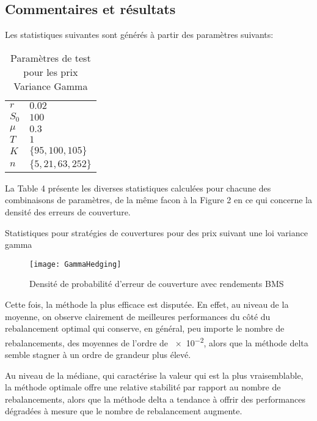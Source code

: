 \documentclass[12pt,fleqn]{article}
\begin{document}
\subsection*{Commentaires et résultats}

Les statistiques suivantes sont générés à partir des paramètres suivants:
\begin{table}[h]
  \centering
  \begin{tabular}[h]{ll}
    $r$ & $0.02$\\
    $S_0$ & $100$\\
    $\mu$ & $0.3$\\
    $T$ & $1$\\
    $K$ & $\{95,100,105\}$\\
    $n$ & $\{5,21,63,252\}$\\
  \end{tabular}
  \caption{Paramètres de test pour les prix Variance Gamma}
  \label{tab:1}
\end{table}

La Table 4 présente les diverses statistiques calculées pour chacune des combinaisons de
paramètres, de la même facon à la Figure 2 en ce qui concerne la densité des erreurs de
couverture. 

\begin{table}
\footnotesize{}
\caption{Statistiques pour stratégies de couvertures pour des prix suivant une loi
  variance gamma}
\end{table}

\begin{figure}
  \centering
  \texttt{[image: GammaHedging]}
  \caption{Densité de probabilité d'erreur de couverture avec rendements BMS}
  \label{fig:1}
\end{figure}

Cette fois, la méthode la plus efficace est disputée. En effet, au niveau de la moyenne,
on observe clairement de meilleures performances du côté du rebalancement optimal qui
conserve, en général, peu importe le nombre de rebalancements, des moyennes de l'ordre de
\num{e-2}, alors que la méthode delta semble stagner à un ordre de grandeur plus élevé. 

Au niveau de la médiane, qui caractérise la valeur qui est la plus vraisemblable, la
méthode optimale offre une relative stabilité par rapport au nombre de rebalancements,
alors que la méthode delta a tendance à offrir des performances dégradées à mesure que le
nombre de rebalancement augmente.
\end{document}
